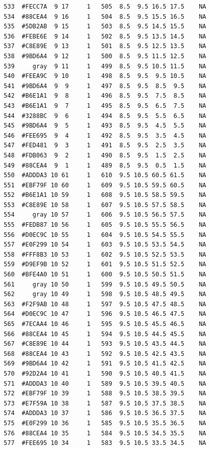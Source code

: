 \documentclass[12pt,twoside]{reedthesis}
\begin{document}
\begin{verbatim}
  533  #FECC7A  9 17     1   505  8.5  9.5 16.5 17.5    NA
  534  #88CEA4  9 16     1   504  8.5  9.5 15.5 16.5    NA
  535  #5DB2AB  9 15     1   503  8.5  9.5 14.5 15.5    NA
  536  #FEBE6E  9 14     1   502  8.5  9.5 13.5 14.5    NA
  537  #C8E89E  9 13     1   501  8.5  9.5 12.5 13.5    NA
  538  #9BD6A4  9 12     1   500  8.5  9.5 11.5 12.5    NA
  539     gray  9 11     1   499  8.5  9.5 10.5 11.5    NA
  540  #FEEA9C  9 10     1   498  8.5  9.5  9.5 10.5    NA
  541  #9BD6A4  9  9     1   497  8.5  9.5  8.5  9.5    NA
  542  #B6E1A1  9  8     1   496  8.5  9.5  7.5  8.5    NA
  543  #B6E1A1  9  7     1   495  8.5  9.5  6.5  7.5    NA
  544  #3288BC  9  6     1   494  8.5  9.5  5.5  6.5    NA
  545  #9BD6A4  9  5     1   493  8.5  9.5  4.5  5.5    NA
  546  #FEE695  9  4     1   492  8.5  9.5  3.5  4.5    NA
  547  #FED481  9  3     1   491  8.5  9.5  2.5  3.5    NA
  548  #FDB063  9  2     1   490  8.5  9.5  1.5  2.5    NA
  549  #88CEA4  9  1     1   489  8.5  9.5  0.5  1.5    NA
  550  #ADDDA3 10 61     1   610  9.5 10.5 60.5 61.5    NA
  551  #EBF79F 10 60     1   609  9.5 10.5 59.5 60.5    NA
  552  #B6E1A1 10 59     1   608  9.5 10.5 58.5 59.5    NA
  553  #C8E89E 10 58     1   607  9.5 10.5 57.5 58.5    NA
  554     gray 10 57     1   606  9.5 10.5 56.5 57.5    NA
  555  #FEDB87 10 56     1   605  9.5 10.5 55.5 56.5    NA
  556  #D0EC9C 10 55     1   604  9.5 10.5 54.5 55.5    NA
  557  #E0F299 10 54     1   603  9.5 10.5 53.5 54.5    NA
  558  #FFF8B3 10 53     1   602  9.5 10.5 52.5 53.5    NA
  559  #D9EF9B 10 52     1   601  9.5 10.5 51.5 52.5    NA
  560  #BFE4A0 10 51     1   600  9.5 10.5 50.5 51.5    NA
  561     gray 10 50     1   599  9.5 10.5 49.5 50.5    NA
  562     gray 10 49     1   598  9.5 10.5 48.5 49.5    NA
  563  #F2F9AB 10 48     1   597  9.5 10.5 47.5 48.5    NA
  564  #D0EC9C 10 47     1   596  9.5 10.5 46.5 47.5    NA
  565  #7ECAA4 10 46     1   595  9.5 10.5 45.5 46.5    NA
  566  #88CEA4 10 45     1   594  9.5 10.5 44.5 45.5    NA
  567  #C8E89E 10 44     1   593  9.5 10.5 43.5 44.5    NA
  568  #88CEA4 10 43     1   592  9.5 10.5 42.5 43.5    NA
  569  #9BD6A4 10 42     1   591  9.5 10.5 41.5 42.5    NA
  570  #92D2A4 10 41     1   590  9.5 10.5 40.5 41.5    NA
  571  #ADDDA3 10 40     1   589  9.5 10.5 39.5 40.5    NA
  572  #EBF79F 10 39     1   588  9.5 10.5 38.5 39.5    NA
  573  #E7F59A 10 38     1   587  9.5 10.5 37.5 38.5    NA
  574  #ADDDA3 10 37     1   586  9.5 10.5 36.5 37.5    NA
  575  #E0F299 10 36     1   585  9.5 10.5 35.5 36.5    NA
  576  #88CEA4 10 35     1   584  9.5 10.5 34.5 35.5    NA
  577  #FEE695 10 34     1   583  9.5 10.5 33.5 34.5    NA

\end{verbatim}
\end{document}
